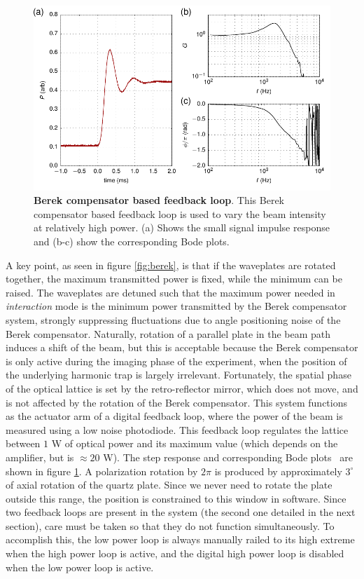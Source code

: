 \documentclass[twocolumn,aps,pra,showpacs,preprintnumbers,bibnotes]{revtex4-1}
\begin{document}
\begin{figure}
  \begin{center}
    \includegraphics{fig/step_response.pdf}
    \caption{\textbf{Berek compensator based feedback loop}. This Berek compensator based feedback loop is used to vary the beam intensity at relatively high power. (a) Shows the small signal impulse response and (b-c) show the corresponding Bode plots.}\label{fig:berek_step_response}
  \end{center}
\end{figure}
A key point, as seen in figure \ref{fig:berek}, is that if the waveplates are rotated together, the maximum transmitted power is fixed, while the minimum can be raised.
The waveplates are detuned such that the maximum power needed in \textit{interaction} mode is the minimum power transmitted by the Berek compensator system, strongly suppressing fluctuations due to angle positioning noise of the Berek compensator. 
Naturally, rotation of a parallel plate in the beam path induces a shift of the beam, but this is acceptable because the Berek compensator is only active during the imaging phase of the experiment, when the position of the underlying harmonic trap is largely irrelevant.
Fortunately, the spatial phase of the optical lattice is set by the retro-reflector mirror, which does not move, and is not affected by the rotation of the Berek compensator.
This system functions as the actuator arm of a digital feedback loop, where the power of the beam is measured using a low noise photodiode. This feedback loop regulates the lattice between $1$ W of optical power and its maximum value (which depends on the amplifier, but is $\approx20$ W).
The step response and corresponding Bode plots~\cite{Bechhoefer2005} are shown in figure \ref{fig:berek_step_response}.
A polarization rotation by $2 \pi$ is produced by approximately $3^\circ$ of axial rotation of the quartz plate. 
Since we never need to rotate the plate outside this range, the position is constrained to this window in software.
Since two feedback loops are present in the system (the second one detailed in the next section), care must be taken so that they do not function simultaneously. 
To accomplish this, the low power loop is always manually railed to its high extreme when the high power loop is active, and the digital high power loop is disabled when the low power loop is active.
\end{document}
